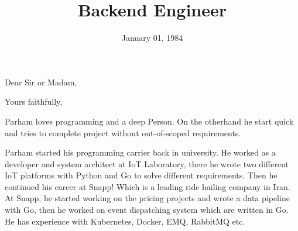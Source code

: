 \documentclass[11pt,a4paper,sans]{moderncv}
\title{Backend Engineer}
\begin{document}
\maketitle

\date{January 01, 1984}
\opening{Dear Sir or Madam,}
\closing{Yours faithfully,}
\makelettertitle

Parham loves programming and a deep Person. On the otherhand he start quick and tries to complete project without out-of-scoped requirements.

Parham started his programming carrier back in university.
He worked as a developer and system architect at IoT Laboratory, there he wrote two different IoT platforms with Python and Go to solve different requirements.
Then he continued his career at Snapp! Which is a leading ride hailing company in Iran. At Snapp,
he started working on the pricing projects and wrote a data pipeline with Go, then he worked on event dispatching system which are written in Go.
He has experience with Kubernetes, Docker, EMQ, RabbitMQ etc.

\makeletterclosing
\end{document}
